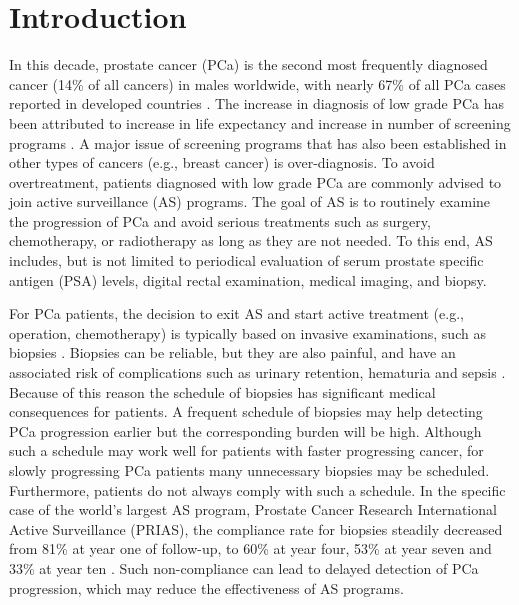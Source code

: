 \section{Introduction}
\label{sec : introduction}
In this decade, prostate cancer (PCa) is the second most frequently diagnosed cancer (14\% of all cancers) in males worldwide, with nearly 67\% of all PCa cases reported in developed countries \citep{GlobalCancerStats2012}. The increase in diagnosis of low grade PCa has been attributed to increase in life expectancy and increase in number of screening programs \citep{potoskyPSAcancer}. A major issue of screening programs that has also been established in other types of cancers (e.g., breast cancer) is over-diagnosis.  To avoid overtreatment, patients diagnosed with low grade PCa are commonly advised to join active surveillance (AS) programs. The goal of AS is to routinely examine the progression of PCa and avoid serious treatments such as surgery, chemotherapy, or radiotherapy as long as they are not needed. To this end, AS includes, but is not limited to periodical evaluation of serum prostate specific antigen (PSA) levels, digital rectal examination, medical imaging, and biopsy.

For PCa patients, the decision to exit AS and start active treatment (e.g., operation, chemotherapy) is typically based on invasive examinations, such as biopsies \citep{bokhorst2016decade}. Biopsies can be reliable, but they are also painful, and have an associated risk of complications such as urinary retention, hematuria and sepsis \citep{loeb2013systematic}. Because of this reason the schedule of  biopsies has significant medical consequences for patients. A frequent schedule of biopsies may help detecting PCa progression earlier but the corresponding burden will be high. Although such a schedule may work well for patients with faster progressing cancer, for slowly progressing PCa patients many unnecessary biopsies may be scheduled. Furthermore, patients do not always comply with such a schedule. In the specific case of the world's largest AS program, Prostate Cancer Research International Active Surveillance (PRIAS), the compliance rate for biopsies steadily decreased from 81\% at year one of follow-up, to 60\% at year four, 53\% at year seven and 33\% at year ten  \citep{bokhorst2015compliance}. Such non-compliance can lead to delayed detection of PCa progression, which may reduce the effectiveness of AS programs.

